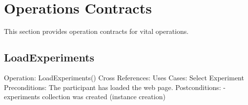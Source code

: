 \section{Operations Contracts}
This section provides operation contracts for vital operations.

\subsection{LoadExperiments}
Operation: LoadExperiments()
Cross References: Uses Cases: Select Experiment
Preconditions: The participant has loaded the web page.
Postconditions:	- experiments collection was created (instance creation)
			

